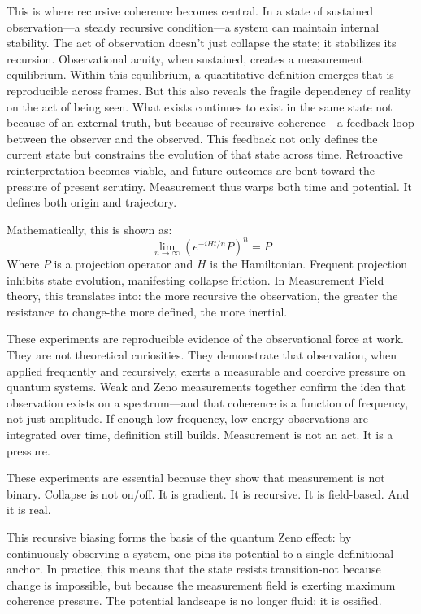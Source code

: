 This is where recursive coherence becomes central. In a state of sustained observation---a steady recursive condition---a system can maintain internal stability. The act of observation doesn’t just collapse the state; it stabilizes its recursion. Observational acuity, when sustained, creates a measurement equilibrium. Within this equilibrium, a quantitative definition emerges that is reproducible across frames. But this also reveals the fragile dependency of reality on the act of being seen. What exists continues to exist in the same state not because of an external truth, but because of recursive coherence---a feedback loop between the observer and the observed. This feedback not only defines the current state but constrains the evolution of that state across time. Retroactive reinterpretation becomes viable, and future outcomes are bent toward the pressure of present scrutiny. Measurement thus warps both time and potential. It defines both origin and trajectory.

Mathematically, this is shown as:
\begin{equation}
\lim_{n \to \infty} \left( e^{-i H t/n} P \right)^n = P
\end{equation}
Where $P$ is a projection operator and $H$ is the Hamiltonian. Frequent projection inhibits state evolution, manifesting collapse friction. In Measurement Field theory, this translates into: the more recursive the observation, the greater the resistance to change-the more defined, the more inertial.

These experiments are reproducible evidence of the observational force at work. They are not theoretical curiosities. They demonstrate that observation, when applied frequently and recursively, exerts a measurable and coercive pressure on quantum systems. Weak and Zeno measurements together confirm the idea that observation exists on a spectrum---and that coherence is a function of frequency, not just amplitude. If enough low-frequency, low-energy observations are integrated over time, definition still builds. Measurement is not an act. It is a pressure.

These experiments are essential because they show that measurement is not binary. Collapse is not on/off. It is gradient. It is recursive. It is field-based. And it is real.

This recursive biasing forms the basis of the quantum Zeno effect: by continuously observing a system, one pins its potential to a single definitional anchor. In practice, this means that the state resists transition-not because change is impossible, but because the measurement field is exerting maximum coherence pressure. The potential landscape is no longer fluid; it is ossified.

